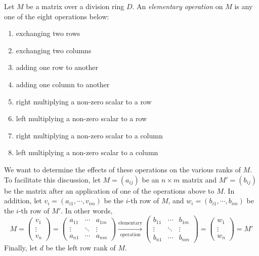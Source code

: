 \documentclass[12pt]{article}
\begin{document}
Let $M$ be a matrix over a division ring $D$.  An \emph{elementary operation} on $M$ is any one of the eight operations below:
\begin{multicols}{2}
\begin{enumerate}
\item exchanging two rows
\item exchanging two columns
\item adding one row to another
\item adding one column to another
\item right multiplying a non-zero scalar to a row
\item left multiplying a non-zero scalar to a row
\item right multiplying a non-zero scalar to a column
\item left multiplying a non-zero scalar to a column
\end{enumerate}
\end{multicols}
We want to determine the effects of these operations on the various ranks of $M$.  To facilitate this discussion, let $M=(a_{ij})$ be an $n\times m$ matrix and $M'=(b_{ij})$ be the matrix after an application of one of the operations above to $M$.  In addition, let $v_i=(a_{i1},\cdots, v_{im})$ be the $i$-th row of $M$, and $w_i=(b_{i1},\cdots, b_{im})$ be the $i$-th row of $M'$.  In other words,
$$
M=
\begin{pmatrix}
v_1 \\
\vdots \\ 
v_n
\end{pmatrix}
=
\begin{pmatrix}
a_{11} & \cdots & a_{1m} \\
\vdots & \ddots & \vdots \\ 
a_{n1} & \cdots & a_{nm}
\end{pmatrix}
\xrightarrow[\textrm{operation}]{\textrm{elementary}}
\begin{pmatrix}
b_{11} & \cdots & b_{1m} \\
\vdots & \ddots & \vdots \\ 
b_{n1} & \cdots & b_{nm}
\end{pmatrix}
=
\begin{pmatrix}
w_1 \\
\vdots \\ 
w_n
\end{pmatrix}
=
M'
$$
Finally, let $d$ be the left row rank of $M$.
\end{document}
